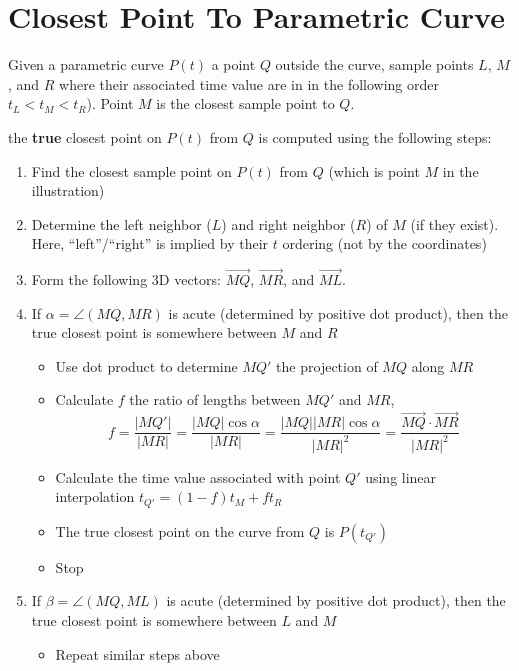 \documentclass[]{article}
\begin{document}
\section*{Closest Point To Parametric Curve}
Given a parametric curve $P(t)$ a point $Q$ outside the curve, sample points $L$, $M$, and $R$ where their associated time value are in
in the following order $t_L < t_M < t_R$). Point $M$ is the closest sample point to $Q$.


the \textbf{true} closest point on $P(t)$ from $Q$ is computed using the following steps:
\begin{enumerate}
  \item Find the closest sample point on $P(t)$ from $Q$ (which is point $M$ in the illustration)
  \item Determine the left neighbor ($L$) and right neighbor ($R$) of $M$ (if they exist).
  Here, ``left''/``right'' is implied by their $t$ ordering (not by the coordinates)
  \item Form the following 3D vectors: $\vec{MQ}$, $\vec{MR}$, and $\vec{ML}$.
  \item If $\alpha = \angle (MQ, MR)$ is acute (determined by positive dot product),
  then the true closest point is somewhere between $M$ and $R$
  \begin{itemize}
    \item Use dot product to determine $MQ'$ the projection of $MQ$ along $MR$
    \item Calculate $f$ the ratio of lengths between $MQ'$ and $MR$,
    $$f = \frac{|MQ'|}{|MR|}= \frac{|MQ| \cos\alpha}{|MR|} = \frac{|MQ||MR| \cos\alpha}{|MR|^2} = \frac{\vec{MQ}\cdot \vec{MR}}{|MR|^2}$$
    \item Calculate the time value associated with point $Q'$ using linear interpolation
    $t_{Q'} = (1-f)t_M + ft_R$
    \item The true closest point on the curve from $Q$ is $P(t_{Q'})$
    \item Stop
  \end{itemize}
  \item If $\beta = \angle (MQ, ML)$ is acute (determined by positive dot product),
  then the true closest point is somewhere between $L$ and $M$
  \begin{itemize}
    \item Repeat similar steps above
  \end{itemize}

\end{enumerate}
\end{document}
